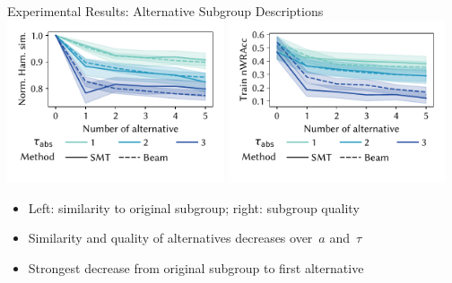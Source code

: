 \documentclass[USenglish]{article} %
\begin{document}
\begin{minipage}[t]{0.49\textwidth}
\begin{standardbox}{Experimental Results: Alternative Subgroup Descriptions}
		\centering
		\includegraphics[width=0.48\textwidth, trim=10 25 10 10, clip]{plots/csd-alternatives-hamming.pdf}
		\hfill
		\includegraphics[width=0.48\textwidth, trim=10 25 10 10, clip]{plots/csd-alternatives-train-nwracc.pdf}
		\begin{itemize}
			\item Left: similarity to original subgroup; right: subgroup quality
			\item Similarity and quality of alternatives decreases over~$a$ and~$\tau$
			\item Strongest decrease from original subgroup to first alternative
		\end{itemize}
	\end{standardbox}
\end{minipage}
\end{document}
